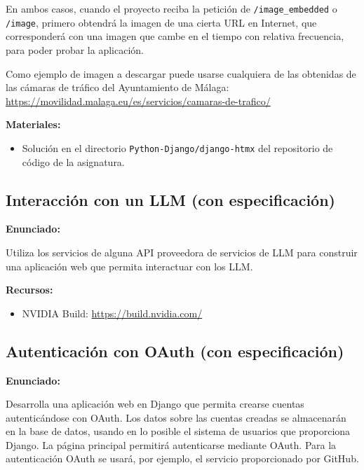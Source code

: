 En ambos casos, cuando el proyecto reciba la petición de \texttt{/image\_embedded} o \texttt{/image}, primero obtendrá la imagen de una cierta URL en Internet, que corresponderá con una imagen que cambe en el tiempo con relativa frecuencia, para poder probar la aplicación.

Como ejemplo de imagen a descargar puede usarse cualquiera de las obtenidas de las cámaras de tráfico del Ayuntamiento de Málaga: \\
\url{https://movilidad.malaga.eu/es/servicios/camaras-de-trafico/}

\textbf{Materiales:}

\begin{itemize}
\item Solución en el directorio \texttt{Python-Django/django-htmx} del repositorio de código de la asignatura.
\end{itemize}



\subsection{Interacción con un LLM (con especificación)}
\label{subsec:django-llm}

\textbf{Enunciado:}

Utiliza los servicios de alguna API proveedora de servicios de LLM para construir una aplicación web que permita interactuar con los LLM.

\textbf{Recursos:}

\begin{itemize}
\item NVIDIA Build: \url{https://build.nvidia.com/}
\end{itemize}

\subsection{Autenticación con OAuth (con especificación)}
\label{subsec:django-oauth}

\textbf{Enunciado:}

Desarrolla una aplicación web en Django que permita crearse cuentas autenticándose con OAuth. Los datos sobre las cuentas creadas se almacenarán en la base de datos, usando en lo posible el sistema de usuarios que proporciona Django. La página principal permitirá autenticarse mediante OAuth. Para la autenticación OAuth se usará, por ejemplo, el servicio proporcionado por GitHub.

